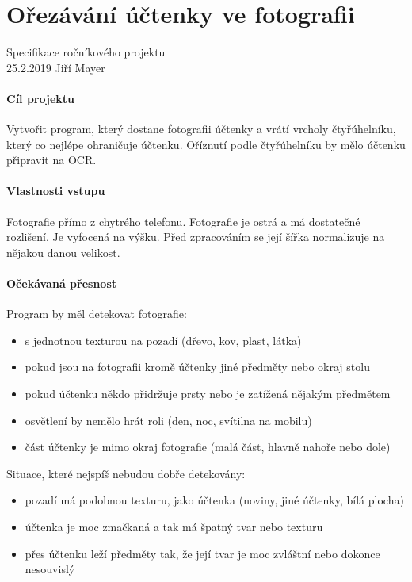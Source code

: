 \documentclass{article}
\begin{document}
\section{Ořezávání účtenky ve fotografii}
Specifikace ročníkového projektu\\
25.2.2019 Jiří Mayer

\paragraph{Cíl projektu\\}

Vytvořit program, který dostane fotografii účtenky a vrátí vrcholy čtyřúhelníku,
který co nejlépe ohraničuje účtenku. Oříznutí podle čtyřúhelníku by mělo
účtenku připravit na OCR.

\paragraph{Vlastnosti vstupu\\}

Fotografie přímo z chytrého telefonu. Fotografie je ostrá a má
dostatečné rozlišení. Je vyfocená na výšku. Před zpracováním
se její šířka normalizuje na nějakou danou velikost.

\paragraph{Očekávaná přesnost\\}

Program by měl detekovat fotografie:

\begin{itemize}
    \itemsep -0.3em
    \item s jednotnou texturou na pozadí (dřevo, kov, plast, látka)
    \item pokud jsou na fotografii kromě účtenky jiné předměty nebo okraj stolu
    \item pokud účtenku někdo přidržuje prsty nebo je zatížená nějakým předmětem
    \item osvětlení by nemělo hrát roli (den, noc, svítilna na mobilu)
    \item část účtenky je mimo okraj fotografie (malá část, hlavně nahoře nebo dole)
\end{itemize}

Situace, které nejspíš nebudou dobře detekovány:

\begin{itemize}
    \itemsep -0.3em
    \item pozadí má podobnou texturu, jako účtenka (noviny, jiné účtenky, bílá plocha)
    \item účtenka je moc zmačkaná a tak má špatný tvar nebo texturu
    \item přes účtenku leží předměty tak, že její tvar je moc zvláštní nebo dokonce nesouvislý
\end{itemize}
\end{document}
